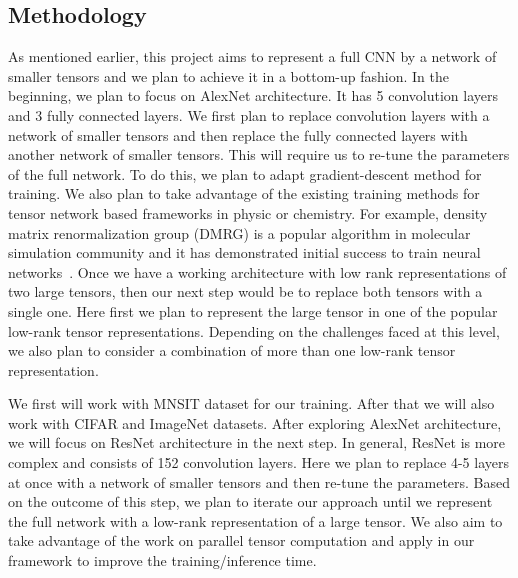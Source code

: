 \documentclass[11pt]{article}
\begin{document}
\subsection{Methodology}
As mentioned earlier, this project aims to represent a full CNN by a network of smaller tensors and we plan to achieve it in a bottom-up fashion. In the beginning, we plan to focus on AlexNet architecture. It has 5 convolution layers and 3 fully connected layers. We first plan to replace convolution layers with a network of smaller tensors and then replace the fully connected layers with another network of smaller tensors. This will require us to re-tune the parameters of the full network. To do this, we plan to adapt gradient-descent method for training. We also plan to take advantage of the existing training methods for tensor network based frameworks in physic or chemistry. For example, density matrix renormalization group (DMRG) is a popular algorithm in molecular simulation community and it has demonstrated initial success to train neural networks~\cite{SS-NIPS2016}. Once we have a working architecture with low rank representations of two large tensors, then our next step would be to replace both tensors with a single one. Here first we plan to represent the large tensor in one of the popular low-rank tensor representations. Depending on the challenges faced at this level, we also plan to consider a combination of more than one low-rank tensor representation.    


We first will work with  MNSIT dataset for our training. After that we will also work with CIFAR and ImageNet datasets. After exploring AlexNet architecture, we will focus on ResNet architecture in the next step. In general, ResNet is more complex and consists of 152 convolution layers. Here we plan to replace 4-5 layers at once with a network of smaller tensors and then re-tune the parameters. Based on the outcome of this step, we plan to iterate our approach until we represent the full network with a low-rank representation of a large tensor. We also aim to take advantage of the  work on parallel tensor computation and apply in our framework to improve the training/inference time.

\end{document}
